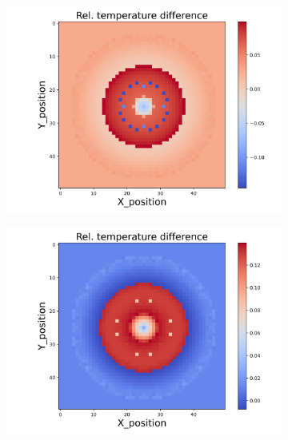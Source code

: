 \begin{figure}[h]
\begin{minipage}{\textwidth}
\begin{subfigure}{0.325\textwidth}
        \end{subfigure}
        \begin{subfigure}{0.325\textwidth}
            \centering
            \includegraphics[width=\textwidth]{figures/raw_data/23/linear/T_bias.jpg}
        \end{subfigure}
        \begin{subfigure}{0.325\textwidth}
            \centering
            \includegraphics[width=\textwidth]{figures/raw_data/24/linear/T_bias.jpg}
        \end{subfigure}
    \end{minipage}\\

\end{figure}
